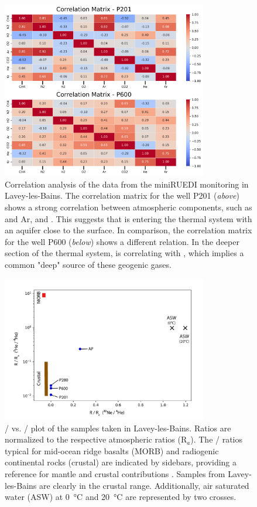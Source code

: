 \newpage
\null
\vfill
\begin{figure}[H]
\centering
\includegraphics[width=0.8\textwidth]{chapters/06_appendix/SI_C2/correlation_plot.pdf}
\caption{Correlation analysis of the data from the miniRUEDI monitoring in Lavey-les-Bains. 
The correlation matrix for the well P201 (\textit{above}) shows a strong correlation between atmospheric components, such as  and Ar, and . 
This suggests that  is entering the thermal system with an aquifer close to the surface.
In comparison, the correlation matrix for the well P600 (\textit{below}) shows a different relation.
In the deeper section of the thermal system,  is correlating with , which implies a common "deep" source of these geogenic gases. 
}
\label{figSI:correlation}
\end{figure}
\vfill 

\newpage
\null
\vfill
\begin{figure}[H]
\centering
\includegraphics[width=0.8\textwidth]{chapters/06_appendix/SI_C2/Ne20-He3-He4.pdf}
\caption{
/ vs. / plot of the samples taken in Lavey-les-Bains.
Ratios are normalized to the respective atmospheric ratios (R$_a$).
The / ratios typical for mid-ocean ridge basalts (MORB) and radiogenic continental rocks (crustal) are indicated by sidebars, providing a reference for mantle and crustal contributions \citep{lupton1983terrestrial}.
Samples from Lavey-les-Bains are clearly in the crustal range.
Additionally, air saturated water (ASW) at \SI{0}{\celsius} and \SI{20}{\celsius} are represented by two crosses.
}
\label{figSI:NeHe_plot}
\end{figure}
\vfill 

